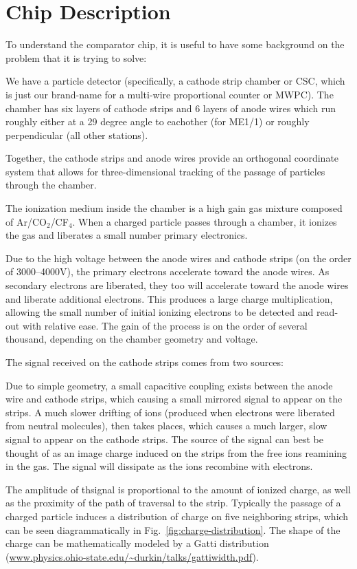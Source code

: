 \documentclass[letterpaper]{article}
\begin{document}
\section{Chip Description}

To understand the comparator chip, it is useful to have some background on the problem that it is trying to solve:

We have a particle detector (specifically, a cathode strip chamber or CSC, which is just our brand-name for a multi-wire proportional counter or MWPC). The chamber has six layers of cathode strips and 6 layers of anode wires which run roughly either at a 29 degree angle to eachother (for ME1/1) or roughly perpendicular (all other stations).

Together, the cathode strips and anode wires provide an orthogonal coordinate system that allows for three-dimensional tracking of the passage of particles through the chamber.

The ionization medium inside the chamber is a high gain gas mixture composed of Ar/CO${_2}$/CF$_{4}$. When a charged particle passes through a chamber, it ionizes the gas and liberates a small number primary electronics.

Due to the high voltage between the anode wires and cathode strips (on the order of 3000--4000V), the primary electrons accelerate toward the anode wires. As secondary electrons are liberated, they too will accelerate toward the anode wires and liberate additional electrons. This produces a large charge multiplication, allowing the small number of initial ionizing electrons to be detected and read-out with relative ease. The gain of the process is on the order of several thousand, depending on the chamber geometry and voltage.

The signal received on the cathode strips comes from two sources:

Due to simple geometry, a small capacitive coupling exists between the anode wire and cathode strips, which causing a small mirrored signal to appear on the strips. A much slower drifting of ions (produced when electrons were liberated from neutral molecules), then takes places, which causes a much larger, slow signal to appear on the cathode strips. The source of the signal can best be thought of as an image charge induced on the strips from the free ions reamining in the gas. The signal will dissipate as the ions recombine with electrons.

The amplitude of thsignal is proportional to the amount of ionized charge, as well as the proximity of the path of traversal to the strip.  Typically the passage of a charged particle induces a distribution of charge on five neighboring strips, which can be seen diagrammatically in Fig.~\ref{fig:charge-distribution}. The shape of the charge can be mathematically modeled by a Gatti distribution (\url{www.physics.ohio-state.edu/~durkin/talks/gattiwidth.pdf}).
\end{document}
